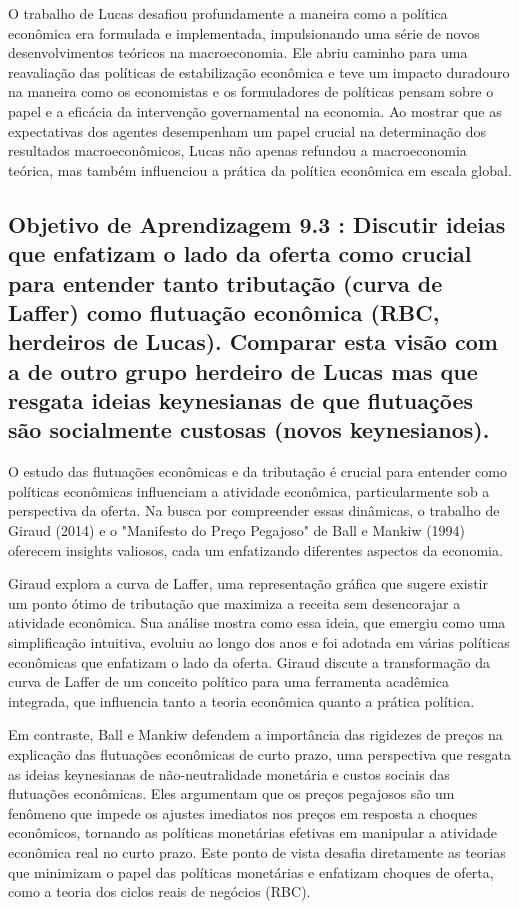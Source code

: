 \documentclass[a4paper,12pt]{article}[abntex2]
\begin{document}
O trabalho de Lucas desafiou profundamente a maneira como a política econômica era formulada e implementada, impulsionando uma série de novos desenvolvimentos teóricos na macroeconomia. Ele abriu caminho para uma reavaliação das políticas de estabilização econômica e teve um impacto duradouro na maneira como os economistas e os formuladores de políticas pensam sobre o papel e a eficácia da intervenção governamental na economia. Ao mostrar que as expectativas dos agentes desempenham um papel crucial na determinação dos resultados macroeconômicos, Lucas não apenas refundou a macroeconomia teórica, mas também influenciou a prática da política econômica em escala global.


\subsection{\textbf{Objetivo de Aprendizagem 9.3 : Discutir ideias que enfatizam o lado da oferta como crucial para entender tanto tributação (curva de Laffer) como flutuação econômica (RBC, herdeiros de Lucas). Comparar esta visão com a de outro grupo herdeiro de Lucas mas que resgata ideias keynesianas de que flutuações são socialmente custosas (novos keynesianos).}}

O estudo das flutuações econômicas e da tributação é crucial para entender como políticas econômicas influenciam a atividade econômica, particularmente sob a perspectiva da oferta. Na busca por compreender essas dinâmicas, o trabalho de Giraud (2014) e o "Manifesto do Preço Pegajoso" de Ball e Mankiw (1994) oferecem insights valiosos, cada um enfatizando diferentes aspectos da economia.

Giraud explora a curva de Laffer, uma representação gráfica que sugere existir um ponto ótimo de tributação que maximiza a receita sem desencorajar a atividade econômica. Sua análise mostra como essa ideia, que emergiu como uma simplificação intuitiva, evoluiu ao longo dos anos e foi adotada em várias políticas econômicas que enfatizam o lado da oferta. Giraud discute a transformação da curva de Laffer de um conceito político para uma ferramenta acadêmica integrada, que influencia tanto a teoria econômica quanto a prática política.

Em contraste, Ball e Mankiw defendem a importância das rigidezes de preços na explicação das flutuações econômicas de curto prazo, uma perspectiva que resgata as ideias keynesianas de não-neutralidade monetária e custos sociais das flutuações econômicas. Eles argumentam que os preços pegajosos são um fenômeno que impede os ajustes imediatos nos preços em resposta a choques econômicos, tornando as políticas monetárias efetivas em manipular a atividade econômica real no curto prazo. Este ponto de vista desafia diretamente as teorias que minimizam o papel das políticas monetárias e enfatizam choques de oferta, como a teoria dos ciclos reais de negócios (RBC).
\end{document}
